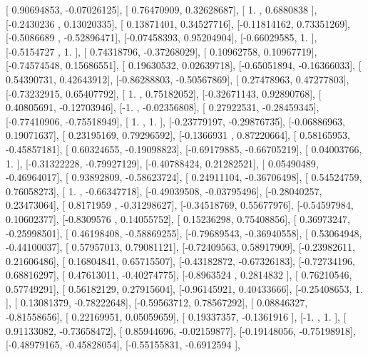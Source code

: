 \documentclass{article}
\begin{document}
       [ 0.90694853, -0.07026125],
       [ 0.76470909,  0.32628687],
       [ 1.        ,  0.6880838 ],
       [-0.2430236 ,  0.13020335],
       [ 0.13871401,  0.34527716],
       [-0.11814162,  0.73351269],
       [-0.5086689 , -0.52896471],
       [-0.07458393,  0.95204904],
       [-0.66029585,  1.        ],
       [-0.5154727 ,  1.        ],
       [ 0.74318796, -0.37268029],
       [ 0.10962758,  0.10967719],
       [-0.74574548,  0.15686551],
       [ 0.19630532,  0.02639718],
       [-0.65051894, -0.16366033],
       [ 0.54390731,  0.42643912],
       [-0.86288803, -0.50567869],
       [ 0.27478963,  0.47277803],
       [-0.73232915,  0.65407792],
       [ 1.        ,  0.75182052],
       [-0.32671143,  0.92890768],
       [ 0.40805691, -0.12703946],
       [-1.        , -0.02356808],
       [ 0.27922531, -0.28459345],
       [-0.77410906, -0.75518949],
       [ 1.        ,  1.        ],
       [-0.23779197, -0.29876735],
       [-0.06886963,  0.19071637],
       [ 0.23195169,  0.79296592],
       [-0.1366931 ,  0.87220664],
       [ 0.58165953, -0.45857181],
       [ 0.60324655, -0.19098823],
       [-0.69179885, -0.66705219],
       [ 0.04003766,  1.        ],
       [-0.31322228, -0.79927129],
       [-0.40788424,  0.21282521],
       [ 0.05490489, -0.46964017],
       [ 0.93892809, -0.58623724],
       [ 0.24911104, -0.36706498],
       [ 0.54524759,  0.76058273],
       [ 1.        , -0.66347718],
       [-0.49039508, -0.03795496],
       [-0.28040257,  0.23473064],
       [ 0.8171959 , -0.31298627],
       [-0.34518769,  0.55677976],
       [-0.54597984,  0.10602377],
       [-0.8309576 ,  0.14055752],
       [ 0.15236298,  0.75408856],
       [ 0.36973247, -0.25998501],
       [ 0.46198408, -0.58869255],
       [-0.79689543, -0.36940558],
       [ 0.53064948, -0.44100037],
       [ 0.57957013,  0.79081121],
       [-0.72409563,  0.58917909],
       [-0.23982611,  0.21606486],
       [ 0.16804841,  0.65715507],
       [-0.43182872, -0.67326183],
       [-0.72734196,  0.68816297],
       [ 0.47613011, -0.40274775],
       [-0.8963524 ,  0.2814832 ],
       [ 0.76210546,  0.57749291],
       [ 0.56182129,  0.27915604],
       [-0.96145921,  0.40433666],
       [-0.25408653,  1.        ],
       [ 0.13081379, -0.78222648],
       [-0.59563712,  0.78567292],
       [ 0.08846327, -0.81558656],
       [ 0.22169951,  0.05059659],
       [ 0.19337357, -0.1361916 ],
       [-1.        ,  1.        ],
       [ 0.91133082, -0.73658472],
       [ 0.85944696, -0.02159877],
       [-0.19148056, -0.75198918],
       [-0.48979165, -0.45828054],
       [-0.55155831, -0.6912594 ],
\end{document}

